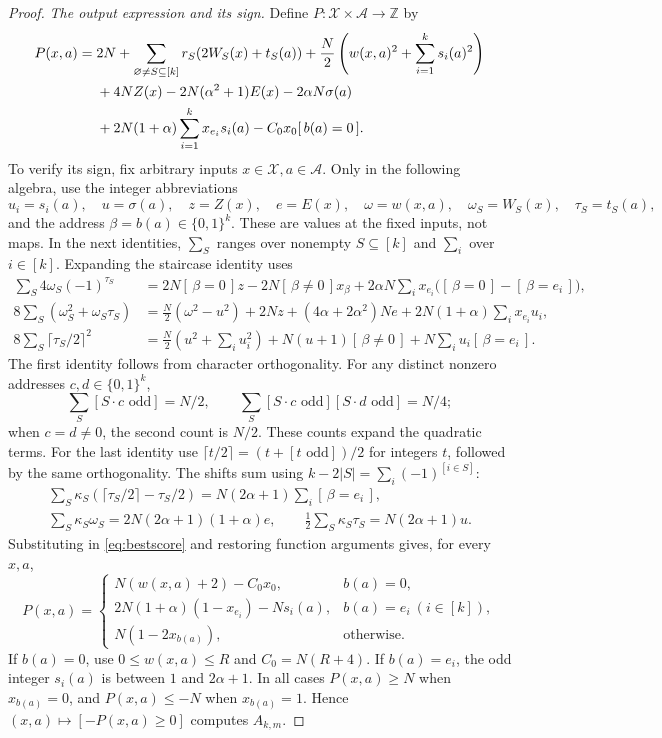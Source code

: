 \documentclass[11pt]{article}
\newcommand{\bits}{\{0,1\}}
\newcommand{\ind}[1]{[\,#1\,]}
\begin{document}
\begin{proof}
\emph{The output expression and its sign.}
Define $P:\mathcal X\times\mathcal A\to\mathbb Z$ by
\begin{align}\label{eq:bestscore}
P(x,a)={}&2N+\sum_{\varnothing\ne S\subseteq[k]}r_S(2W_S(x)+t_S(a))
 +\frac N2\left(w(x,a)^2+\sum_{i=1}^k s_i(a)^2\right)\notag\\
 &+4NZ(x)-2N(\alpha^2+1)E(x)-2\alpha N\sigma(a)\notag\\
 &+2N(1+\alpha)\sum_{i=1}^k x_{e_i}s_i(a)-C_0x_0\ind{b(a)=0}.
\end{align}
To verify its sign, fix arbitrary inputs $x\in\mathcal X,a\in\mathcal A$.
Only in the following algebra, use the integer abbreviations
$$u_i=s_i(a),\quad u=\sigma(a),\quad z=Z(x),\quad e=E(x),\quad
\omega=w(x,a),\quad \omega_S=W_S(x),\quad \tau_S=t_S(a),$$
and the address $\beta=b(a)\in\bits^k$.
These are values at the fixed inputs, not maps. In the next identities,
$\sum_S$ ranges over nonempty $S\subseteq[k]$ and $\sum_i$ over $i\in[k]$.
Expanding the staircase identity uses
\begin{align*}
\sum_S4\omega_S(-1)^{\tau_S}
 &=2N\ind{\beta=0}z-2N\ind{\beta\ne0}x_\beta
   +2\alpha N\sum_i x_{e_i}\bigl(\ind{\beta=0}-\ind{\beta=e_i}\bigr),\\
8\sum_S(\omega_S^2+\omega_S\tau_S)
 &=\frac N2(\omega^2-u^2)+2Nz+(4\alpha+2\alpha^2)Ne
   +2N(1+\alpha)\sum_i x_{e_i}u_i,\\
8\sum_S\lceil\tau_S/2\rceil^2
 &=\frac N2\left(u^2+\sum_i u_i^2\right)
   +N(u+1)\ind{\beta\ne0}+N\sum_i u_i\ind{\beta=e_i}.
\end{align*}
The first identity follows from character orthogonality.
For any distinct nonzero addresses $c,d\in\bits^k$,
$$\sum_S[S\cdot c\text{ odd}]=N/2,\qquad
\sum_S[S\cdot c\text{ odd}][S\cdot d\text{ odd}]=N/4;$$
when $c=d\ne0$, the second count is $N/2$.
These counts expand the quadratic terms.
For the last identity use $\lceil t/2\rceil=(t+[t\text{ odd}])/2$
for integers $t$, followed by the same orthogonality.
The shifts sum using $k-2|S|=\sum_i(-1)^{[i\in S]}$:
\begin{gather*}
\sum_S\kappa_S(\lceil\tau_S/2\rceil-\tau_S/2)
   =N(2\alpha+1)\sum_i\ind{\beta=e_i},\\
\sum_S\kappa_S\omega_S=2N(2\alpha+1)(1+\alpha)e,\qquad
\frac12\sum_S\kappa_S\tau_S=N(2\alpha+1)u.
\end{gather*}
Substituting in \eqref{eq:bestscore} and restoring function arguments gives,
for every $x,a$,
\begin{equation}\label{eq:bestclosed}
P(x,a)=\begin{cases}
N(w(x,a)+2)-C_0x_0,&b(a)=0,\\
2N(1+\alpha)(1-x_{e_i})-Ns_i(a),&b(a)=e_i\ (i\in[k]),\\
N(1-2x_{b(a)}),&\text{otherwise}.
\end{cases}
\end{equation}
If $b(a)=0$, use $0\le w(x,a)\le R$ and $C_0=N(R+4)$.
If $b(a)=e_i$, the odd integer $s_i(a)$ is between $1$ and $2\alpha+1$.
In all cases $P(x,a)\ge N$ when $x_{b(a)}=0$, and $P(x,a)\le-N$ when
$x_{b(a)}=1$. Hence $(x,a)\mapsto[-P(x,a)\ge0]$ computes $A_{k,m}$.


\end{proof}
\end{document}
